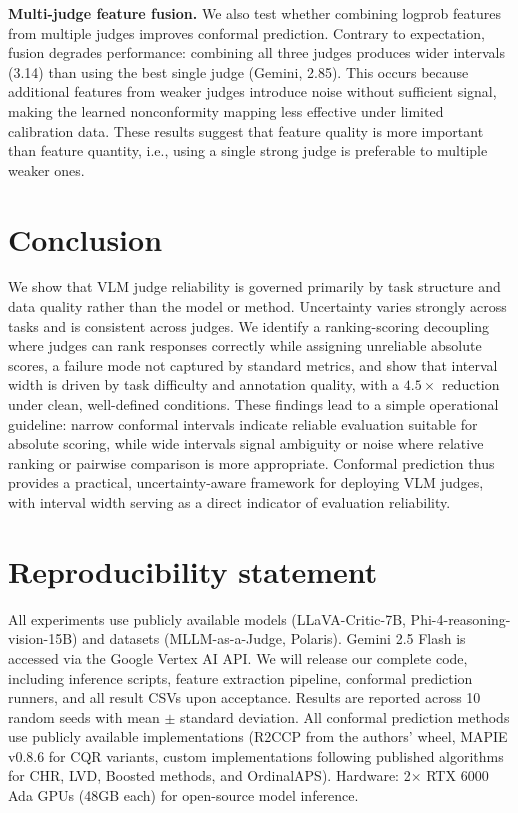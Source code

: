 \documentclass{article}
\begin{document}
\textbf{Multi-judge feature fusion.}
We also test whether combining logprob features from multiple judges improves conformal prediction. Contrary to expectation, fusion degrades performance: combining all three judges produces wider intervals (3.14) than using the best single judge (Gemini, 2.85). This occurs because additional features from weaker judges introduce noise without sufficient signal, making the learned nonconformity mapping less effective under limited calibration data. These results suggest that feature quality is more important than feature quantity, i.e., using a single strong judge is preferable to multiple weaker ones.

\section{Conclusion}
\label{sec:conclusion}

We show that VLM judge reliability is governed primarily by task structure and data quality rather than the model or method. Uncertainty varies strongly across tasks and is consistent across judges. We identify a ranking-scoring decoupling where judges can rank responses correctly while assigning unreliable absolute scores, a failure mode not captured by standard metrics, and show that interval width is driven by task difficulty and annotation quality, with a $4.5\times$ reduction under clean, well-defined conditions. These findings lead to a simple operational guideline: narrow conformal intervals indicate reliable evaluation suitable for absolute scoring, while wide intervals signal ambiguity or noise where relative ranking or pairwise comparison is more appropriate. Conformal prediction thus provides a practical, uncertainty-aware framework for deploying VLM judges, with interval width serving as a direct indicator of evaluation reliability.


\section*{Reproducibility statement}
All experiments use publicly available models (LLaVA-Critic-7B, Phi-4-reasoning-vision-15B) and datasets (MLLM-as-a-Judge, Polaris). Gemini 2.5 Flash is accessed via the Google Vertex AI API. We will release our complete code, including inference scripts, feature extraction pipeline, conformal prediction runners, and all result CSVs upon acceptance. Results are reported across 10 random seeds with mean $\pm$ standard deviation. All conformal prediction methods use publicly available implementations (R2CCP from the authors' wheel, MAPIE v0.8.6 for CQR variants, custom implementations following published algorithms for CHR, LVD, Boosted methods, and OrdinalAPS). Hardware: 2$\times$ RTX 6000 Ada GPUs (48GB each) for open-source model inference.
\end{document}
